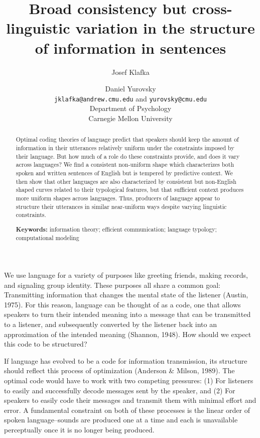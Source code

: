 \documentclass[10pt, letterpaper]{article}
\title{Broad consistency but cross-linguistic variation in the structure
of information in sentences}
\author{Josef Klafka \and Daniel Yurovsky \\
        \texttt{jklafka@andrew.cmu.edu} and \texttt{yurovsky@cmu.edu} \\
       Department of Psychology \\ Carnegie Mellon University}
\begin{document}
\maketitle

\begin{abstract}
Optimal coding theories of language predict that speakers should keep
the amount of information in their utterances relatively uniform under
the constraints imposed by their language. But how much of a role do
these constraints provide, and does it vary across languages? We find a
consistent non-uniform shape which characterizes both spoken and written
sentences of English but is tempered by predictive context. We then show
that other languages are also characterized by consistent but
non-English shaped curves related to their typological features, but
that sufficient context produces more uniform shapes across languages.
Thus, producers of language appear to structure their utterances in
similar near-uniform ways despite varying linguistic constraints.

\textbf{Keywords:}
information theory; efficient communication; language typology;
computational modeling
\end{abstract}

We use language for a variety of purposes like greeting friends, making
records, and signaling group identity. These purposes all share a common
goal: Transmitting information that changes the mental state of the
listener (Austin, 1975). For this reason, language can be thought of as
a code, one that allows speakers to turn their intended meaning into a
message that can be transmitted to a listener, and subsequently
converted by the listener back into an approximation of the intended
meaning (Shannon, 1948). How should we expect this code to be
structured?

If language has evolved to be a code for information transmission, its
structure should reflect this process of optimization (Anderson \&
Milson, 1989). The optimal code would have to work with two competing
pressures: (1) For listeners to easily and successfully decode messages
sent by the speaker, and (2) For speakers to easily code their messages
and transmit them with minimal effort and error. A fundamental
constraint on both of these processes is the linear order of spoken
language--sounds are produced one at a time and each is unavailable
perceptually once it is no longer being produced.
\end{document}
